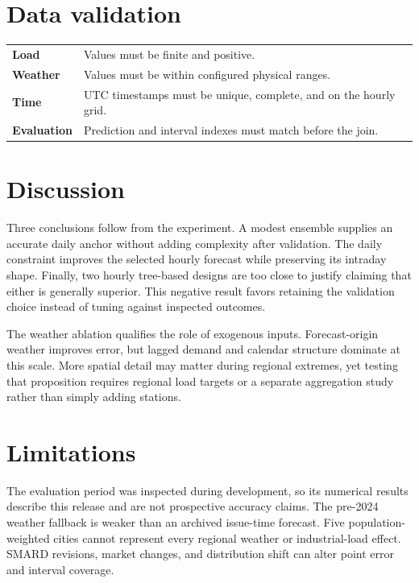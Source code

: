 \documentclass[10.5pt,a4paper]{article}
\begin{document}
\section{Data validation}

\begin{tabularx}{\textwidth}{>{\bfseries}l X}
Load & Values must be finite and positive.\\
Weather & Values must be within configured physical ranges.\\
Time & UTC timestamps must be unique, complete, and on the hourly grid.\\
Evaluation & Prediction and interval indexes must match before the join.\\
\end{tabularx}

\section{Discussion}

Three conclusions follow from the experiment. A modest ensemble supplies an accurate daily anchor
without adding complexity after validation. The daily constraint improves the selected hourly
forecast while preserving its intraday shape. Finally, two hourly tree-based designs are too close
to justify claiming that either is generally superior. This negative result favors retaining the
validation choice instead of tuning against inspected outcomes.

The weather ablation qualifies the role of exogenous inputs. Forecast-origin weather improves error,
but lagged demand and calendar structure dominate at this scale. More spatial detail may matter
during regional extremes, yet testing that proposition requires regional load targets or a separate
aggregation study rather than simply adding stations.

\section{Limitations}

The evaluation period was inspected during development, so its numerical results describe this
release and are not prospective accuracy claims. The pre-2024 weather fallback is weaker than an
archived issue-time forecast. Five population-weighted cities cannot represent every regional
weather or industrial-load effect. SMARD revisions, market changes, and distribution shift can alter point
error and interval coverage.
\end{document}

